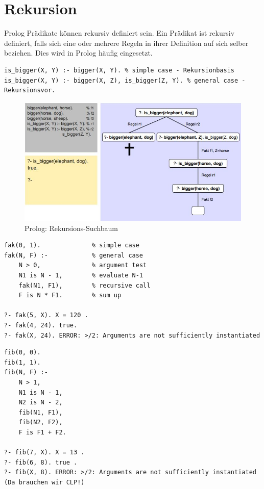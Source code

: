 \newpage
\section{Rekursion}
Prolog Prädikate können rekursiv definiert sein. Ein Prädikat ist rekursiv definiert, falls sich eine oder mehrere Regeln in ihrer Definition auf sich selber beziehen. Dies wird in Prolog häufig eingesetzt.

\begin{lstlisting}[caption=Beispiel Rekursion]
is_bigger(X, Y) :- bigger(X, Y). % simple case - Rekursionbasis
is_bigger(X, Y) :- bigger(X, Z), is_bigger(Z, Y). % general case - Rekursionsvor.
\end{lstlisting}

\begin{figure}[h!]
\centering
\includegraphics[width=0.7\linewidth]{fig/prolog-suchbaum-rekursion}
\caption{Prolog: Rekursions-Suchbaum}
\label{fig:prolog-suchbaum-rekursion}
\end{figure}

\begin{lstlisting}[caption=Fakultät]
fak(0, 1). 				% simple case
fak(N, F) :- 			% general case
	N > 0, 				% argument test
	N1 is N - 1, 		% evaluate N-1
	fak(N1, F1), 		% recursive call
	F is N * F1. 		% sum up

?- fak(5, X). X = 120 .
?- fak(4, 24). true.
?- fak(X, 24). ERROR: >/2: Arguments are not sufficiently instantiated
\end{lstlisting}

\begin{lstlisting}[caption=Fibonacci, label=lst:naiv-fib]
% Naive Implementierung! Optimierung mittels Endrekursion und Assertions.
fib(0, 0).
fib(1, 1).
fib(N, F) :-
	N > 1,
	N1 is N - 1,
	N2 is N - 2,
	fib(N1, F1),
	fib(N2, F2),
	F is F1 + F2.

?- fib(7, X). X = 13 .
?- fib(6, 8). true .
?- fib(X, 8). ERROR: >/2: Arguments are not sufficiently instantiated (Da brauchen wir CLP!)
\end{lstlisting}



